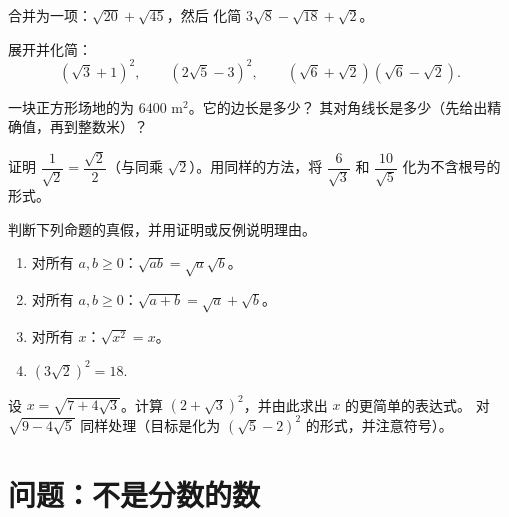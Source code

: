 \begin{exercise}[$\star$]\label{exo:g9:sqrt:5}
合并为一项：$\sqrt{20} + \sqrt{45}$，然后
化简 $3\sqrt8 - \sqrt{18} + \sqrt2$。
\end{exercise}

\begin{exercise}[$\star\star$]\label{exo:g9:sqrt:6}
展开并化简：
\[
\left(\sqrt3 + 1\right)^2, \qquad
\left(2\sqrt5 - 3\right)^2, \qquad
\left(\sqrt6 + \sqrt2\right)\left(\sqrt6 - \sqrt2\right).
\]
\end{exercise}

\begin{exercise}[$\star\star$]\label{exo:g9:sqrt:7}
一块正方形场地的为 $6400$ m$^2$。它的边长是多少？
其对角线长是多少（先给出精确值，再到整数米）？
\end{exercise}

\begin{exercise}[$\star\star$]\label{exo:g9:sqrt:8}
证明 $\dfrac{1}{\sqrt2} = \dfrac{\sqrt2}{2}$（与同乘
$\sqrt2$）。用同样的方法，将 $\dfrac{6}{\sqrt3}$
和 $\dfrac{10}{\sqrt5}$ 化为不含根号的形式。
\end{exercise}

\begin{exercise}[$\star\star$]\label{exo:g9:sqrt:9}
判断下列命题的真假，并用证明或反例说明理由。
\begin{enumerate}
  \item 对所有 $a, b \geq 0$：$\sqrt{ab} = \sqrt a \sqrt b$。
  \item 对所有 $a, b \geq 0$：$\sqrt{a+b} = \sqrt a + \sqrt b$。
  \item 对所有 $x$：$\sqrt{x^2} = x$。
  \item $\left(3\sqrt2\right)^2 = 18$.
\end{enumerate}
\end{exercise}

\begin{exercise}[$\star\star\star$]\label{exo:g9:sqrt:10}
设 $x = \sqrt{7 + 4\sqrt3}$。计算
$\left(2 + \sqrt3\right)^2$，并由此求出 $x$ 的更简单的表达式。
对 $\sqrt{9 - 4\sqrt5}$ 同样处理（目标是化为
$\left(\sqrt5 - 2\right)^2$ 的形式，并注意符号）。
\end{exercise}

\section{问题：不是分数的数}

